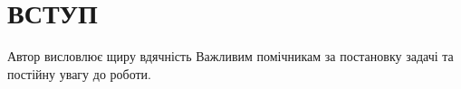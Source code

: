 \chapter{ВСТУП}



Автор висловлює щиру вдячність Важливим помічникам за постановку задачі та постійну увагу до роботи.